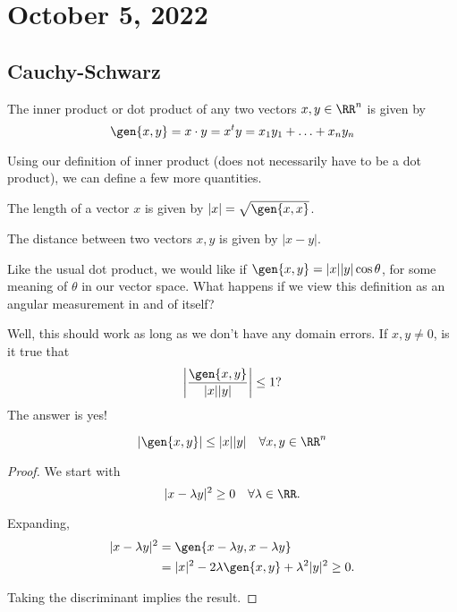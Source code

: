 \section{October 5, 2022}

\subsection{Cauchy-Schwarz}

\begin{definition}

The \ac{inner product} or \ac{dot product} of any two vectors $x,y\in \RR^n$ is given by 
\[\gen{x,y} = x\cdot y = x^ty = x_1y_1+\hdots+x_ny_n\]
\end{definition}

Using our definition of inner product (does not necessarily have to be a dot product), we can define a few more quantities. 

\begin{definition}

The \ac{length} of a vector $x$ is given by $\vert x\vert = \sqrt{\gen{x,x}}$.
\end{definition}

\begin{definition}

The \ac{distance} between two vectors $x,y$ is given by $\vert x-y\vert$. 
\end{definition}

Like the usual dot product, we would like if $\gen{x,y} = \vert x\vert \vert y\vert \cos{\theta}$, for some meaning of $\theta$ in our vector space. What happens if we view this definition as an angular measurement in and of itself?

Well, this should work as long as we don't have any domain errors. If $x,y\neq 0$, is it true that 
\[\left\vert\frac{\gen{x,y}}{\vert x\vert\vert y\vert}\right\vert \leq 1?\]
The answer is yes!

\begin{theorem}

\[\vert \gen{x,y}\vert \leq \vert x\vert \vert y\vert \quad \forall x,y\in \RR^n\]
\end{theorem}

\begin{proof}
We start with 
\[\vert x-\lambda y\vert^2 \geq 0\quad \forall \lambda \in \RR.\]

Expanding, 
\begin{align*}
    \vert x-\lambda y\vert^2 &= \gen{x-\lambda y, x-\lambda y} \\
    &= \vert x\vert^2 - 2\lambda \gen{x,y} + \lambda^2\vert y\vert^2 \geq 0.
\end{align*}

Taking the discriminant implies the result. 
\end{proof}

